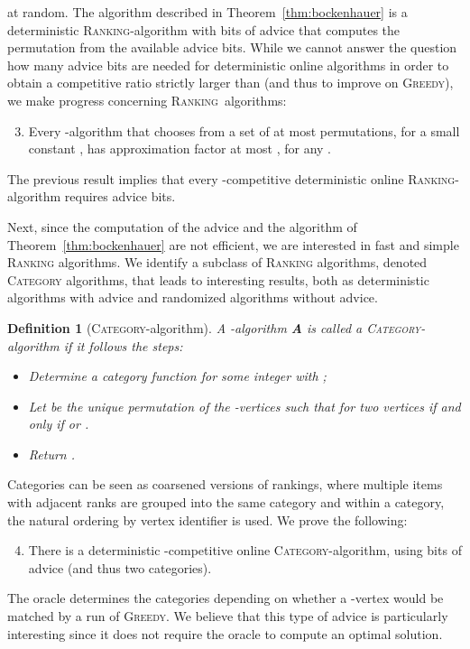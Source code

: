 \documentclass[a4paper]{article}
\newcommand{\Rank}{\textsc{Ranking}}
\newtheorem{definition}{Definition}
\begin{document}
at random. The algorithm
described in Theorem~\ref{thm:bockenhauer} is a deterministic \Rank-algorithm with  bits
of advice that computes the permutation  from the available advice bits.
While we cannot answer the question how many advice bits are needed for deterministic online algorithms
in order to obtain a competitive ratio strictly larger than  (and thus to improve on \textsc{Greedy}),
we make progress concerning \Rank~algorithms:
\begin{enumerate}
\setcounter{enumi}{2}
 \item Every -algorithm that chooses  from a set of at most
  permutations, for a small constant , has approximation factor
 at most , for any .
\end{enumerate}
The previous result implies that every -competitive deterministic online
\textsc{Ranking}-algorithm requires  advice bits.

Next, since the computation of the advice and the algorithm of Theorem~\ref{thm:bockenhauer} are not efficient,
we are interested in fast and simple \textsc{Ranking} algorithms. We identify a subclass of \textsc{Ranking} algorithms,
denoted \textsc{Category} algorithms, that leads to interesting results, both as deterministic algorithms with advice and
randomized algorithms without advice.

\begin{definition}[\textsc{Category}-algorithm]
 A -algorithm \textbf{A} is called a \textsc{Category}-algorithm if it follows the steps:
 \begin{itemize}
  \item Determine a category function  for some integer  with ;
  \item Let  be the unique permutation of the
-vertices such that for two vertices   if
and only if  or .
 \item Return .
 \end{itemize}
\end{definition}
Categories can be seen as coarsened versions of rankings, where multiple items with adjacent ranks are
grouped into the same category and within a category, the natural ordering by vertex identifier is used.
We prove the following:
\begin{enumerate}
\setcounter{enumi}{3}\item
 There is a deterministic -competitive online \textsc{Category}-algorithm,
 using  bits of advice (and thus two categories).
\end{enumerate}
The oracle determines the categories depending on whether a -vertex would be matched by a run of \textsc{Greedy}.
We believe that this type of advice is particularly interesting since it does not require the oracle to compute an
optimal solution.
\end{document}
